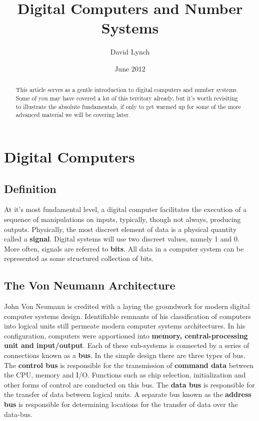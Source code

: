 \documentclass[10pt,a4paper]{article}
\title{Digital Computers and Number Systems}
\author{David Lynch}
\date{June 2012}
\begin{document}
\maketitle
\begin{abstract}
This article serves as a gentle introduction to digital computers and number systems. Some of you may have covered a lot of this territory already, but it's worth revisiting to illustrate the absolute fundamentals, if only to get warmed up for some of the more advanced material we will be covering later. 
\end{abstract}
\section{Digital Computers}
\subsection{Definition}
At it's most fundamental level, a digital computer facilitates the execution of a sequence of manipulations on inputs, typically, though not always, producing outputs. Physically, the most discreet element of data is a physical quantity called a {\bf signal}. Digital systems will use two discreet values, namely 1 and 0. More often, signals are referred to {\bf bits}. All data in a computer system can be represented as some structured collection of bits. 
\subsection{The Von Neumann Architecture}
John Von Neumann is credited with a laying the groundwork for modern digital computer systems design. Identifiable remnants of his classification of computers into logical units still permeate modern computer systems architectures. In his configuration, computers were apportioned into {\bf memory, central-processing unit and input/output}. Each of these sub-systems is connected by a series of connections known as a {\bf bus}. In the simple design there are three types of bus. The {\bf control bus} is responsible for the transmission of {\bf command data} between the CPU, memory and I/O. Functions such as chip selection, initialization and other forms of control are conducted on this bus. The {\bf data bus} is responsible for the transfer of data between logical units. A separate bus known as the {\bf address bus} is responsible for determining locations for the transfer of data over the data-bus. 
\end{document}
